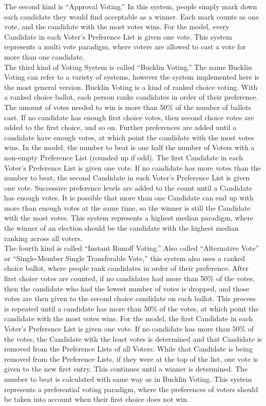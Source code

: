 \documentclass[12pt]{article}
\begin{document}
\qquad The second kind is ``Approval Voting.'' In this system, people simply mark down each candidate they would find acceptable as a winner. Each mark counts as one vote, and the candidate with the most votes wins. For the model, every Candidate in each Voter's Preference List is given one vote. This system represents a multi vote paradigm, where voters are allowed to cast a vote for more than one candidate. \\

\qquad The third kind of Voting System is called ``Bucklin Voting.'' The name Bucklin Voting can refer to a variety of systems, however the system implemented here is the most general version. Bucklin Voting is a kind of ranked choice voting. With a ranked choice ballot, each person ranks candidates in order of their preference. The amount of votes needed to win is more than 50\% of the number of ballots cast. If no candidate has enough first choice votes, then second choice votes are added to the first choice, and so on. Further preferences are added until a candidate have enough votes, at which point the candidate with the most votes wins. In the model, the number to beat is one half the number of Voters with a non-empty Preference List (rounded up if odd). The first Candidate in each Voter's Preference List is given one vote. If no candidate has more votes than the number to beat, the second Candidate in each Voter's Preference List is given one vote. Successive preference levels are added to the count until a Candidate has enough votes. It is possible that more than one Candidate can end up with more than enough votes at the same time, so the winner is still the Candidate with the most votes. This system represents a highest median paradigm, where the winner of an election should be the candidate with the highest median ranking across all voters. \\

\qquad The fourth kind is called ``Instant Runoff Voting.'' Also called ``Alternative Vote'' or ``Single-Member Single Transferable Vote,'' this system also uses a ranked choice ballot, where people rank candidates in order of their preference. After first choice votes are counted, if no candidates had more than 50\% of the votes, then the candidate who had the lowest number of votes is dropped, and those votes are then given to the second choice candidate on each ballot. This process is repeated until a candidate has more than 50\% of the votes, at which point the candidate with the most votes wins. For the model, the first Candidate in each Voter's Preference List is given one vote. If no candidate has more than 50\% of the votes, the Candidate with the least votes is determined and that Candidate is removed from the Preference Lists of all Voters. While that Candidate is being removed from the Preference Lists, if they were at the top of the list, one vote is given to the new first entry. This continues until a winner is determined. The number to beat is calculated with same way as in Bucklin Voting. This system represents a preferential voting paradigm, where the preferences of voters should be taken into account when their first choice does not win. \\
\end{document}
